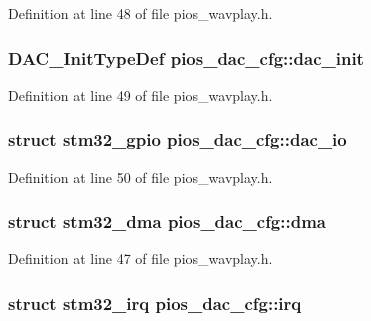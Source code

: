 \-Definition at line 48 of file pios\-\_\-wavplay.\-h.

\hypertarget{group___p_i_o_s___w_a_v_p_l_a_y_ga2da6286f80191750fd6960a67d4a1e20}{
\subsubsection[{dac\-\_\-init}]{\setlength{\rightskip}{0pt plus 5cm}\-D\-A\-C\-\_\-\-Init\-Type\-Def {\bf pios\-\_\-dac\-\_\-cfg\-::dac\-\_\-init}}}\label{group___p_i_o_s___w_a_v_p_l_a_y_ga2da6286f80191750fd6960a67d4a1e20}


\-Definition at line 49 of file pios\-\_\-wavplay.\-h.

\hypertarget{group___p_i_o_s___w_a_v_p_l_a_y_gae02d1c0fa0764b2cf3172a8d3582295f}{
\subsubsection[{dac\-\_\-io}]{\setlength{\rightskip}{0pt plus 5cm}struct {\bf stm32\-\_\-gpio} {\bf pios\-\_\-dac\-\_\-cfg\-::dac\-\_\-io}}}\label{group___p_i_o_s___w_a_v_p_l_a_y_gae02d1c0fa0764b2cf3172a8d3582295f}


\-Definition at line 50 of file pios\-\_\-wavplay.\-h.

\hypertarget{group___p_i_o_s___w_a_v_p_l_a_y_ga9794db8fe6627bb998ba905f5ec5b869}{
\subsubsection[{dma}]{\setlength{\rightskip}{0pt plus 5cm}struct {\bf stm32\-\_\-dma} {\bf pios\-\_\-dac\-\_\-cfg\-::dma}}}\label{group___p_i_o_s___w_a_v_p_l_a_y_ga9794db8fe6627bb998ba905f5ec5b869}


\-Definition at line 47 of file pios\-\_\-wavplay.\-h.

\hypertarget{group___p_i_o_s___w_a_v_p_l_a_y_ga1db4430fc674d954d396ce5abf14307c}{
\subsubsection[{irq}]{\setlength{\rightskip}{0pt plus 5cm}struct {\bf stm32\-\_\-irq} {\bf pios\-\_\-dac\-\_\-cfg\-::irq}}}\label{group___p_i_o_s___w_a_v_p_l_a_y_ga1db4430fc674d954d396ce5abf14307c}


